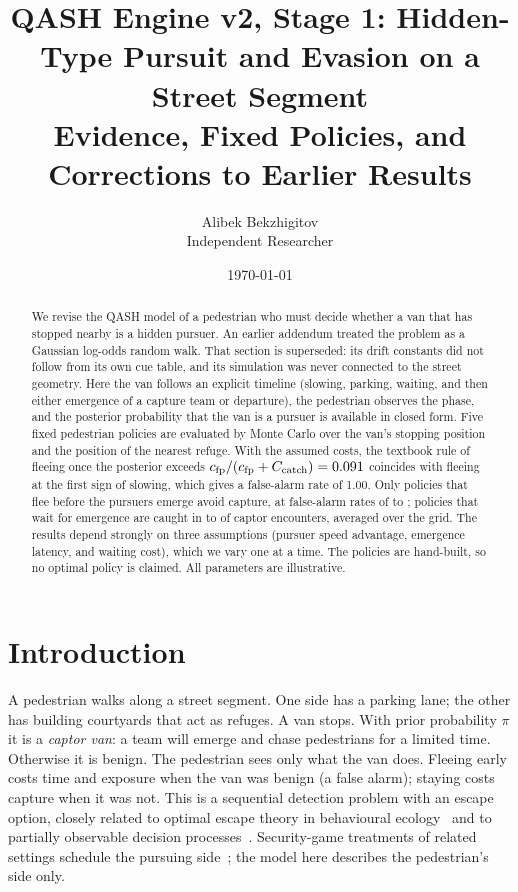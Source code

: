 \documentclass[11pt,a4paper]{article}
\title{\textbf{QASH Engine v2, Stage 1: Hidden-Type Pursuit and Evasion on a Street Segment\\[2pt]
\large Evidence, Fixed Policies, and Corrections to Earlier Results}}
\author{Alibek Bekzhigitov\\Independent Researcher}
\date{\today}
\begin{document}
\maketitle

\begin{abstract}
We revise the QASH model of a pedestrian who must decide whether a van that has stopped nearby is a hidden pursuer. An earlier addendum treated the problem as a Gaussian log-odds random walk. That section is superseded: its drift constants did not follow from its own cue table, and its simulation was never connected to the street geometry. Here the van follows an explicit timeline (slowing, parking, waiting, and then either emergence of a capture team or departure), the pedestrian observes the phase, and the posterior probability that the van is a pursuer is available in closed form. Five fixed pedestrian policies are evaluated by Monte Carlo over the van's stopping position and the position of the nearest refuge. With the assumed costs, the textbook rule of fleeing once the posterior exceeds $c_{\mathrm{fp}}/(c_{\mathrm{fp}}+C_{\mathrm{catch}})=0.091$ coincides with fleeing at the first sign of slowing, which gives a false-alarm rate of 1.00. Only policies that flee before the pursuers emerge avoid capture, at false-alarm rates of \falseAlarmFleePark{} to \falseAlarmFleeSlow{}; policies that wait for emergence are caught in \missGridWaitDeploy{} to \missGridNaive{} of captor encounters, averaged over the grid. The results depend strongly on three assumptions (pursuer speed advantage, emergence latency, and waiting cost), which we vary one at a time. The policies are hand-built, so no optimal policy is claimed. All parameters are illustrative.
\end{abstract}

\section{Introduction}
A pedestrian walks along a street segment. One side has a parking lane; the other has building courtyards that act as refuges. A van stops. With prior probability $\pi$ it is a \emph{captor van}: a team will emerge and chase pedestrians for a limited time. Otherwise it is benign. The pedestrian sees only what the van does. Fleeing early costs time and exposure when the van was benign (a false alarm); staying costs capture when it was not. This is a sequential detection problem with an escape option, closely related to optimal escape theory in behavioural ecology~\cite{ydenberg1986} and to partially observable decision processes~\cite{kaelbling1998}. Security-game treatments of related settings schedule the pursuing side~\cite{yin2012}; the model here describes the pedestrian's side only.
\end{document}
